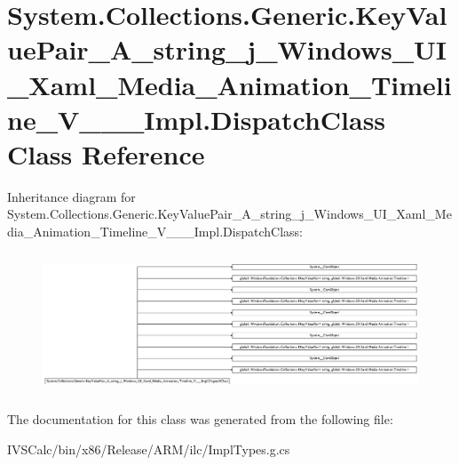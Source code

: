 \hypertarget{class_system_1_1_collections_1_1_generic_1_1_key_value_pair___a__string__j___windows___u_i___xamcddd5ef92f4852b25277d42cf5d56db6}{}\section{System.\+Collections.\+Generic.\+Key\+Value\+Pair\+\_\+\+A\+\_\+string\+\_\+j\+\_\+\+Windows\+\_\+\+U\+I\+\_\+\+Xaml\+\_\+\+Media\+\_\+\+Animation\+\_\+\+Timeline\+\_\+\+V\+\_\+\+\_\+\+\_\+\+Impl.\+Dispatch\+Class Class Reference}
\label{class_system_1_1_collections_1_1_generic_1_1_key_value_pair___a__string__j___windows___u_i___xamcddd5ef92f4852b25277d42cf5d56db6}
Inheritance diagram for System.\+Collections.\+Generic.\+Key\+Value\+Pair\+\_\+\+A\+\_\+string\+\_\+j\+\_\+\+Windows\+\_\+\+U\+I\+\_\+\+Xaml\+\_\+\+Media\+\_\+\+Animation\+\_\+\+Timeline\+\_\+\+V\+\_\+\+\_\+\+\_\+\+Impl.\+Dispatch\+Class\+:\begin{figure}[H]
\begin{center}
\leavevmode
\includegraphics[height=4.213407cm]{class_system_1_1_collections_1_1_generic_1_1_key_value_pair___a__string__j___windows___u_i___xamcddd5ef92f4852b25277d42cf5d56db6}
\end{center}
\end{figure}


The documentation for this class was generated from the following file\+:\begin{DoxyCompactItemize}
\item 
I\+V\+S\+Calc/bin/x86/\+Release/\+A\+R\+M/ilc/Impl\+Types.\+g.\+cs\end{DoxyCompactItemize}
